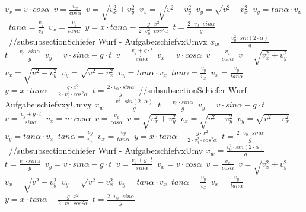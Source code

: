 $ v_{x}  = v\cdot  cos\alpha $\ 
$ v= \frac{ v_{x} }{ cos\alpha } $\ 
$ v= \sqrt{ v_{x} ^{2} + v_{y} ^{2} } $\ 
$ v_{x} = \sqrt{ v^{2}  - v_{y} ^{2} } $\ 
$ v_{y} = \sqrt{ v^{2}  - v_{x} ^{2} } $\ 
$ v_{y} = tan \alpha \cdot  v_{x} $\ 
$ tan \alpha = \frac{v_{y} }{v_{x} } $\ 
$ v_{x} = \frac{v_{y} }{tan \alpha } $\ 
$ y = x\cdot tan \alpha  - \frac{   g\cdot x^{2} }{2\cdot v^{2} _{0} \cdot cos ^{2}\alpha } $\ 
$ t =\frac{2\cdot v_{0} \cdot sin \alpha }{ g} $\ 
//subsubsection{Schiefer Wurf  - Aufgabe:schiefvxUmvx} 
$ x_{w}  = \frac{v_{0} ^{2} \cdot sin(2\cdot \alpha )}{       g} $\ 
$ t =\frac{v_{0} \cdot sin \alpha }{  g} $\ 
$ v_{y}  =  v\cdot sin\alpha - g\cdot t $\ 
$ v= \frac{ v_{y} +g\cdot t}{ sin\alpha } $\ 
$ v_{x}  = v\cdot  cos\alpha $\ 
$ v= \frac{ v_{x} }{ cos\alpha } $\ 
$ v= \sqrt{ v_{x} ^{2} + v_{y} ^{2} } $\ 
$ v_{x} = \sqrt{ v^{2}  - v_{y} ^{2} } $\ 
$ v_{y} = \sqrt{ v^{2}  - v_{x} ^{2} } $\ 
$ v_{y} = tan \alpha \cdot  v_{x} $\ 
$ tan \alpha = \frac{v_{y} }{v_{x} } $\ 
$ v_{x} = \frac{v_{y} }{tan \alpha } $\ 
$ y = x\cdot tan \alpha  - \frac{   g\cdot x^{2} }{2\cdot v^{2} _{0} \cdot cos ^{2}\alpha } $\ 
$ t =\frac{2\cdot v_{0} \cdot sin \alpha }{ g} $\ 
//subsubsection{Schiefer Wurf  - Aufgabe:schiefvxyUmvy} 
$ x_{w}  = \frac{v_{0} ^{2} \cdot sin(2\cdot \alpha )}{       g} $\ 
$ t =\frac{v_{0} \cdot sin \alpha }{  g} $\ 
$ v_{y}  =  v\cdot sin\alpha - g\cdot t $\ 
$ v= \frac{ v_{y} +g\cdot t}{ sin\alpha } $\ 
$ v_{x}  = v\cdot  cos\alpha $\ 
$ v= \frac{ v_{x} }{ cos\alpha } $\ 
$ v= \sqrt{ v_{x} ^{2} + v_{y} ^{2} } $\ 
$ v_{x} = \sqrt{ v^{2}  - v_{y} ^{2} } $\ 
$ v_{y} = \sqrt{ v^{2}  - v_{x} ^{2} } $\ 
$ v_{y} = tan \alpha \cdot  v_{x} $\ 
$ tan \alpha = \frac{v_{y} }{v_{x} } $\ 
$ v_{x} = \frac{v_{y} }{tan \alpha } $\ 
$ y = x\cdot tan \alpha  - \frac{   g\cdot x^{2} }{2\cdot v^{2} _{0} \cdot cos ^{2}\alpha } $\ 
$ t =\frac{2\cdot v_{0} \cdot sin \alpha }{ g} $\ 
//subsubsection{Schiefer Wurf  - Aufgabe:schiefvxUmv} 
$ x_{w}  = \frac{v_{0} ^{2} \cdot sin(2\cdot \alpha )}{       g} $\ 
$ t =\frac{v_{0} \cdot sin \alpha }{  g} $\ 
$ v_{y}  =  v\cdot sin\alpha - g\cdot t $\ 
$ v= \frac{ v_{y} +g\cdot t}{ sin\alpha } $\ 
$ v_{x}  = v\cdot  cos\alpha $\ 
$ v= \frac{ v_{x} }{ cos\alpha } $\ 
$ v= \sqrt{ v_{x} ^{2} + v_{y} ^{2} } $\ 
$ v_{x} = \sqrt{ v^{2}  - v_{y} ^{2} } $\ 
$ v_{y} = \sqrt{ v^{2}  - v_{x} ^{2} } $\ 
$ v_{y} = tan \alpha \cdot  v_{x} $\ 
$ tan \alpha = \frac{v_{y} }{v_{x} } $\ 
$ v_{x} = \frac{v_{y} }{tan \alpha } $\ 
$ y = x\cdot tan \alpha  - \frac{   g\cdot x^{2} }{2\cdot v^{2} _{0} \cdot cos ^{2}\alpha } $\ 
$ t =\frac{2\cdot v_{0} \cdot sin \alpha }{ g} $\ 
